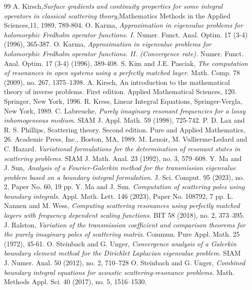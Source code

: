 \documentclass{article}
\begin{document}
\begin{thebibliography}{99}
		 A. Kirsch,{\em Surface gradients and continuity properties for some integral operators in classical scattering theory},Mathematics Methods in the Applied Sciences,11, 1989, 789-804.
		 O. Karma, {\em Approximation in eigenvalue problems for holomorphic Fredholm operator functions. I.} Numer. Funct. Anal. Optim. 17 (3-4) (1996), 365-387.
		 O. Karma, {\em Approximation in eigenvalue problems for holomorphic Fredholm operator functions. II. (Convergence rate).} Numer. Funct. Anal. Optim. 17 (3-4) (1996), 389-408.
		 S. Kim and J.E. Pasciak, {\em The computation of resonances in open systems using a perfectly matched layer.}  Math. Comp. 78 (2009), no. 267, 1375–1398.
		 A. Kirsch, An introduction to the mathematical theory of inverse problems. First edition. Applied Mathematical Sciences, 120. Springer, New York, 1996.
		 R. Kress, Linear Integral Equations, Springer-Vergla, New York, 1989.
		 C. Labreuche, {\em  Purely imaginary resonant frequencies for a lossy inhomogeneous medium}.  SIAM J. Appl. Math. 59 (1998), 725-742.
		 P. D. Lax and R. S. Phillips, Scattering theory. Second edition. Pure and Applied Mathematics, 26. Academic Press, Inc., Boston, MA, 1989.
		 M. Lenoir, M. Vullierme-Ledard and C. Hazard. {\em Variational formulations for the determination of resonant states in scattering problems.} SIAM J. Math. Anal. 23 (1992), no. 3, 579–608.
		 Y. Ma and J. Sun, {\em Analysis of a Fourier-Galerkin method for the transmission eigenvalue problem based on a boundary integral formulation}.  J. Sci. Comput. 95 (2023), no. 2, Paper No. 60, 19 pp.
		 Y. Ma and J. Sun. {\em Computation of scattering poles using boundary integrals.} Appl. Math. Lett. 146 (2023), Paper No. 108792, 7 pp.
		 L. Nannen and M. Wess, {\em Computing scattering resonances using perfectly matched layers with frequency dependent scaling functions.} BIT 58 (2018), no. 2, 373–395.
		 J. Ralston, {\em Variation of the transmission coefficient and comparison theorems for the purely imaginary poles of scattering matrix}. Commun. Pure Appl. Math. 25 (1972),  45-61.
		 O. Steinbach and G. Unger, {\em Convergence analysis of a Galerkin boundary element method for the Dirichlet Laplacian eigenvalue problem.} SIAM J. Numer. Anal. 50 (2012), no. 2, 710–728
		 O. Steinbach and G. Unger, {\em Combined boundary integral equations for acoustic scattering-resonance problems.} Math. Methods Appl. Sci. 40 (2017), no. 5, 1516–1530.

\end{thebibliography}
\end{document}
